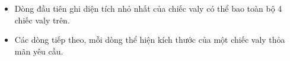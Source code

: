 \begin{itemize}
	\item Dòng đầu tiên ghi diện tích nhỏ nhất của chiếc valy có thể bao toàn bộ 4 chiếc valy trên.
	\item Các dòng tiếp theo, mỗi dòng thể hiện kích thước của một chiếc valy thỏa mãn yêu cầu.
\end{itemize}